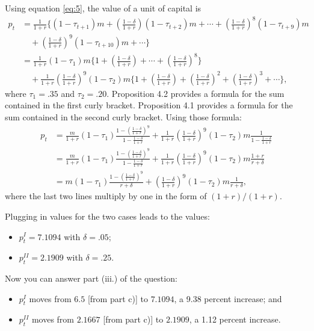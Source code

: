 \documentclass[12pt]{pracjourn_rwr}
\theoremstyle{definition}
\theoremstyle{remark}
\begin{document}
Using equation \eqref{eq:5}, the value of a unit of capital is
\begin{align*}
p_{t} &= \frac{1}{1+r} \Bigg\{ (1-\tau_{t+1})m + \left( \frac{1-\delta}{1+r} \right)(1-\tau_{t+2})m + \cdots  +
\left( \frac{1-\delta}{1+r} \right)^{8} (1-\tau_{t+9}) m \\
&\quad + \left( \frac{1-\delta}{1+r} \right)^{9} (1-\tau_{t+10}) m + \cdots \Bigg\} \\
&= \frac{1}{1+r} (1-\tau_{1})m \Bigg\{ 1 + \left( \frac{1-\delta}{1+r} \right) + \cdots  +
\left( \frac{1-\delta}{1+r} \right)^{8} \Bigg\} \\
&\quad + \frac{1}{1+r} \left( \frac{1-\delta}{1+r} \right)^{9}(1-\tau_{2})m
\Bigg\{
1 + \left( \frac{1-\delta}{1+r} \right) + \left( \frac{1-\delta}{1+r} \right)^{2} + \left( \frac{1-\delta}{1+r} \right)^{3} + \cdots
\Bigg\},
\end{align*}
where $\tau_{1} = .35$ and $\tau_{2} = .20$.
Proposition 4.2 provides a formula for the sum contained in the first curly bracket.
Proposition 4.1 provides a formula for the sum contained in the second curly bracket.
Using those formula:
\begin{align*}
p_{t} &= \frac{m}{1+r} (1-\tau_{1}) \frac{1 - \left( \frac{1-\delta}{1+r} \right)^{9}}{1 - \frac{1-\delta}{1+r}} +
\frac{1}{1+r}\left( \frac{1-\delta}{1+r} \right)^{9}(1-\tau_{2})m \frac{1}{1 - \frac{1-\delta}{1+r}} \\
&= \frac{m}{1+r} (1-\tau_{1}) \frac{1 - \left( \frac{1-\delta}{1+r} \right)^{9}}{1 - \frac{1-\delta}{1+r}} +
\frac{1}{1+r} \left( \frac{1-\delta}{1+r} \right)^{9}(1-\tau_{2})m \frac{1+r}{r + \delta} \\
&= m (1-\tau_{1}) \frac{1 - \left( \frac{1-\delta}{1+r} \right)^{9}}{r+\delta} +
\left( \frac{1-\delta}{1+r} \right)^{9}(1-\tau_{2})m \frac{1}{r + \delta},
\end{align*}
where the last two lines multiply by one in the form of $(1+r) / (1+r)$.

Plugging in values for the two cases leads to the values:
\begin{itemize}
\item $p^{I}_{t} = 7.1094$ with $\delta = .05$;
\item $p^{II}_{t} = 2.1909$ with $\delta = .25$.
\end{itemize}

Now you can answer part (iii.) of the question:
\begin{itemize}
\item $p_{t}^{I}$ moves from $6.5$ [from part c)] to $7.1094$, a 9.38 percent increase; and
\item $p_{t}^{II}$ moves from $2.1667$ [from part c)] to $2.1909$, a 1.12 percent increase.
\end{itemize}
\end{document}
